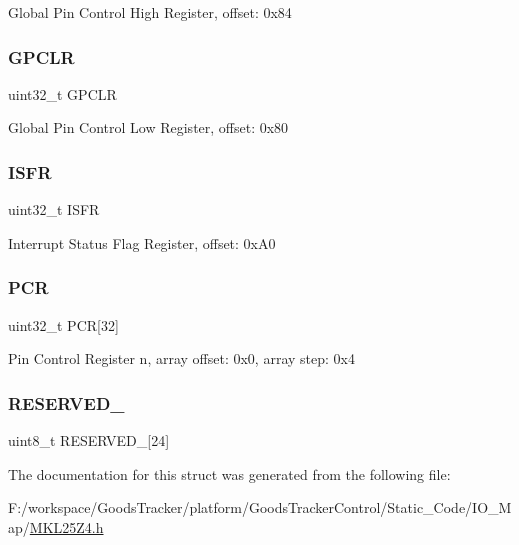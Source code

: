 Global Pin Control High Register, offset\+: 0x84 \mbox{\label{struct_p_o_r_t___mem_map_a6e7a9e797813e20f3c1719d92158e1c9}} 
\subsubsection{\texorpdfstring{G\+P\+C\+LR}{GPCLR}}
{\footnotesize\ttfamily uint32\+\_\+t G\+P\+C\+LR}

Global Pin Control Low Register, offset\+: 0x80 \mbox{\label{struct_p_o_r_t___mem_map_a5c88289be439e694726a8c11ae0059fc}} 
\subsubsection{\texorpdfstring{I\+S\+FR}{ISFR}}
{\footnotesize\ttfamily uint32\+\_\+t I\+S\+FR}

Interrupt Status Flag Register, offset\+: 0x\+A0 \mbox{\label{struct_p_o_r_t___mem_map_ad806aad894fe96382a78c6119527d0e8}} 
\subsubsection{\texorpdfstring{P\+CR}{PCR}}
{\footnotesize\ttfamily uint32\+\_\+t P\+CR\mbox{[}32\mbox{]}}

Pin Control Register n, array offset\+: 0x0, array step\+: 0x4 \mbox{\label{struct_p_o_r_t___mem_map_a33a1c574e559dc57bb2fc28166bf6341}} 
\subsubsection{\texorpdfstring{R\+E\+S\+E\+R\+V\+E\+D\+\_}{RESERVED\_0}}
{\footnotesize\ttfamily uint8\+\_\+t R\+E\+S\+E\+R\+V\+E\+D\+\_\mbox{[}24\mbox{]}}



The documentation for this struct was generated from the following file\+:\begin{DoxyCompactItemize}
\item 
F\+:/workspace/\+Goods\+Tracker/platform/\+Goods\+Tracker\+Control/\+Static\+\_\+\+Code/\+I\+O\+\_\+\+Map/\hyperlink{_m_k_l25_z4_8h}{M\+K\+L25\+Z4.\+h}\end{DoxyCompactItemize}
